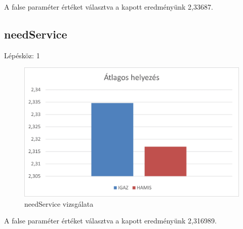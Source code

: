 A false paraméter értéket választva a kapott eredményünk 2,33687.
\newpage
\subsection{needService}
Lépésköz: 1
\begin{figure}[h!]
\centering
\includegraphics[scale=0.2]{images/ccvv.png}
\caption{needService vizsgálata}
\label{fig:ff}
\end{figure}

A false paraméter értéket választva a kapott eredményünk 2,316989.
